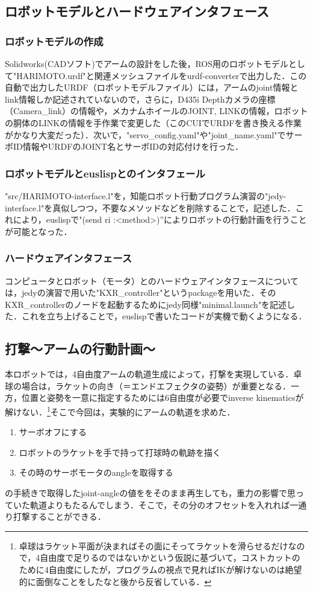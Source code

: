 \documentclass[10pt, oneside, titlepage]{ltjarticle}  %
\begin{document}
  \subsection{ロボットモデルとハードウェアインタフェース}
    \subsubsection{ロボットモデルの作成}
    Solidworks(CADソフト)でアームの設計をした後，ROS用のロボットモデルとして"HARIMOTO.urdf"と関連メッシュファイルをurdf-converterで出力した．この自動で出力したURDF（ロボットモデルファイル）には，アームのjoint情報とlink情報しか記述されていないので，さらに，D435i Depthカメラの座標（Camera\_link）の情報や，メカナムホイールのJOINT, LINKの情報，ロボットの胴体のLINKの情報を手作業で変更した（このCUIでURDFを書き換える作業がかなり大変だった）．次いで，"servo\_config.yaml"や"joint\_name.yaml"でサーボID情報やURDFのJOINT名とサーボIDの対応付けを行った．

    \subsubsection{ロボットモデルとeuslispとのインタフェール}
    "src/HARIMOTO-interface.l"を，知能ロボット行動プログラム演習の"jedy-interface.l"を真似しつつ，不要なメソッドなどを削除することで，記述した．これにより，euslispで"(send ri :<method>)”によりロボットの行動計画を行うことが可能となった．
    \subsubsection{ハードウェアインタフェース}
    コンピュータとロボット（モータ）とのハードウェアインタフェースについては，jedyの演習で用いた"KXR\_controller"というpackageを用いた．そのKXR\_controllerのノードを起動するためにjedy同様"minimal.launch"を記述した．これを立ち上げることで，euslispで書いたコードが実機で動くようになる．

  \subsection{打撃〜アームの行動計画〜}
  本ロボットでは，4自由度アームの軌道生成によって，打撃を実現している．卓球の場合は，ラケットの向き（＝エンドエフェクタの姿勢）が重要となる．一方，位置と姿勢を一意に指定するためには6自由度が必要でinverse kinematicsが解けない．\footnote{卓球はラケット平面が決まればその面にそってラケットを滑らせるだけなので，4自由度で足りるのではないかという仮説に基づいて，コストカットのために4自由度にしたが，プログラムの視点で見ればIKが解けないのは絶望的に面倒なことをしたなと後から反省している．}そこで今回は，実験的にアームの軌道を求めた．
  \begin{enumerate}
    \item サーボオフにする
    \item ロボットのラケットを手で持って打球時の軌跡を描く
    \item その時のサーボモータのangleを取得する
  \end{enumerate}
  の手続きで取得したjoint-angleの値ををそのまま再生しても，重力の影響で思っていた軌道よりもたるんでしまう．そこで，その分のオフセットを入れれば一通り打撃することができる．
\end{document}

